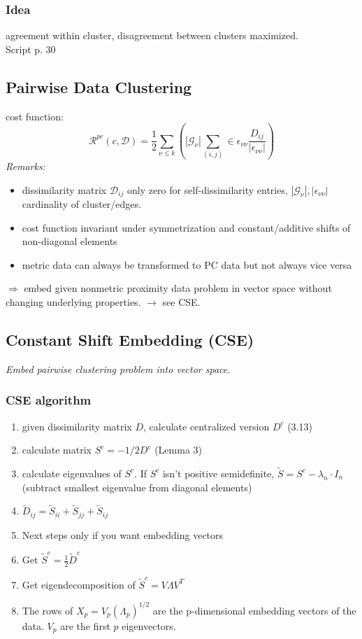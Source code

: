 \documentclass[9pt,parskip]{scrartcl}
\begin{document}
\begin{multicols*}{4}
\subsubsection*{Idea}
agreement within cluster, disagreement between clusters maximized. \\
Script p. 30
\subsection*{Pairwise Data Clustering}
cost function: 
\[\mathcal{R}^{pc}(c, \mathcal{D}) = \frac 1 2 \sum_{\nu \leq k} \left( |\mathcal{G}_{\nu}| \sum_{(i,j)} \in \epsilon_{\nu \nu} \frac{D_{ij}}{|\epsilon_{\nu \nu}|} \right) \]
\textit{Remarks:} 
\begin{itemize}
	\item dissimilarity matrix $\mathcal{D}_{ij}$ only zero for self-dissimilarity entries, $|\mathcal{G}_{\nu}|, |\epsilon_{\nu \nu}|$ cardinality of cluster/edges. 
	\item cost function invariant under symmetrization and constant/additive shifts of non-diagonal elements
	\item metric data can always be transformed to PC data but not always vice versa
\end{itemize}
$ \Rightarrow $ embed given nonmetric proximity data problem in vector space without changing underlying properties. $\rightarrow$ see CSE.
\subsection*{Constant Shift Embedding (CSE)}
\textit{Embed pairwise clustering problem into vector space.}
\subsubsection*{CSE algorithm}
\begin{enumerate}
	\item given dissimilarity matrix $D$, calculate centralized version $D^c$ (3.13)
	\item calculate matrix $S^c = - 1/2 D^c$ (Lemma 3)
	\item calculate eigenvalues of $S^c$. If $S^c$ isn't positive semidefinite, $\tilde{S} = S^c - \lambda_n \cdot I_n$ (subtract smallest eigenvalue from diagonal elements)
	\item  $\tilde{D}_{ij} =  \tilde{S}_{ii} +   \tilde{S}_{jj} + \tilde{S}_{ij} $
	\item Next steps only if you want embedding vectors
	\item Get $\tilde{S}^c = \frac{1}{2}\tilde{D}^c$
	\item Get eigendecomposition of $\tilde{S}^c = V\Lambda V^T$
	\item The rows of $X_p = V_p (\Lambda_p)^{1/2}$ are the p-dimensional embedding vectors of the data. $V_p$ are the first $p$ eigenvectors.
\end{enumerate}


\end{multicols*}
\end{document}
